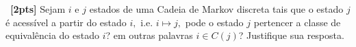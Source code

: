 \documentclass[a4paper,12pt,oneside,twocolumn]{Config/milktest}
\begin{document}







\medskip 
\question~\textbf{[2pts]} Sejam $i$ e $j$ estados de uma Cadeia de Markov discreta tais que  o estado $j$ é acessível a partir do estado $i,$ i.e. $i \longmapsto j,$ pode o estado $j$ pertencer a classe de equivalência do estado $i$? em outras palavras $i  \in C(j)$? Justifique sua resposta. 
\break
\end{document}
